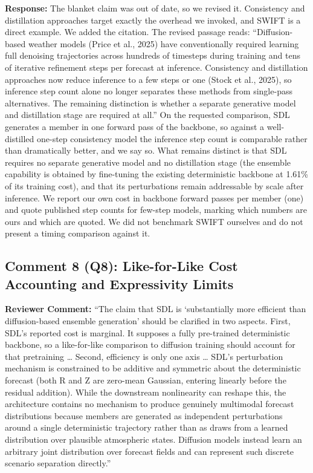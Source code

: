 \documentclass[12pt]{article}
\begin{document}
\textbf{Response:} The blanket claim was out of date, so we revised it. Consistency and distillation approaches target exactly the
overhead we invoked, and SWIFT is a direct example. We added the citation. The
revised passage reads: ``Diffusion-based weather models (Price et al., 2025) have
conventionally required learning full denoising trajectories across hundreds of
timesteps during training and tens of iterative refinement steps per forecast at
inference. Consistency and distillation approaches now reduce inference to a few
steps or one (Stock et al., 2025), so inference step count alone no longer separates
these methods from single-pass alternatives. The remaining distinction is whether a
separate generative model and distillation stage are required at all.'' On the requested comparison, SDL generates a member in one forward
pass of the backbone, so against a well-distilled one-step consistency model the
inference step count is comparable rather than dramatically better, and we say so.
What remains distinct is that SDL requires no separate generative model and no
distillation stage (the ensemble capability is obtained by fine-tuning the existing
deterministic backbone at 1.61\% of its training cost), and that its perturbations
remain addressable by scale after inference. We report our own cost in
backbone forward passes per member (one) and quote published step counts for few-step
models, marking which numbers are ours and which are quoted. We did not benchmark
SWIFT ourselves and do not present a timing comparison against it.

\subsection*{Comment 8 (Q8): Like-for-Like Cost Accounting and Expressivity Limits}

\textbf{Reviewer Comment:} ``The claim that SDL is `substantially more efficient than
diffusion-based ensemble generation' should be clarified in two aspects. First, SDL's
reported cost is marginal. It supposes a fully pre-trained deterministic backbone, so
a like-for-like comparison to diffusion training should account for that pretraining
\ldots{} Second, efficiency is only one axis \ldots{} SDL's perturbation mechanism is
constrained to be additive and symmetric about the deterministic forecast (both R and
Z are zero-mean Gaussian, entering linearly before the residual addition). While the
downstream nonlinearity can reshape this, the architecture contains no mechanism to
produce genuinely multimodal forecast distributions because members are generated as
independent perturbations around a single deterministic trajectory rather than as
draws from a learned distribution over plausible atmospheric states. Diffusion models
instead learn an arbitrary joint distribution over forecast fields and can represent
such discrete scenario separation directly.''
\end{document}

